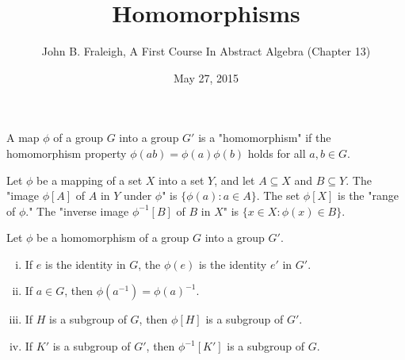 \documentclass[a4paper,11pt]{article}
\title{Homomorphisms}
\author{John B. Fraleigh, A First Course In Abstract Algebra (Chapter 13)}
\date{May 27, 2015}
\begin{document}
\maketitle
{}

\begin{outline}

    A map \(\phi\) of a group \(G\) into a group \(G'\) is a "homomorphism" if the
    homomorphism property \(\phi(ab) = \phi(a)\phi(b)\) holds for all \(a, b \in G\).
    
    Let \(\phi\) be a mapping of a set \(X\) into a set \(Y\), and let \(A \subseteq X\)
    and \(B \subseteq Y\). The "image \(\phi[A]\) of \(A\) in \(Y\) under \(\phi\)" is \(\{\phi(a) : a \in A\}\).
    The set \(\phi[X]\) is the "range of \(\phi\)." The "inverse image \(\phi^{-1}[B]\) of \(B\) in \(X\)" is
    \(\{x \in X : \phi(x) \in B\}\).
    
    Let \(\phi\) be a homomorphism of a group \(G\) into a group \(G'\).
    \begin{enumerate}[i.]
      \item If \(e\) is the identity in \(G\), the \(\phi(e)\) is the identity \(e'\) in \(G'\).
      \item If \(a \in G\), then \(\phi(a^{-1}) = \phi(a)^{-1}\).
      \item If \(H\) is a subgroup of \(G\), then \(\phi[H]\) is a subgroup of \(G'\).
      \item If \(K'\) is a subgroup of \(G'\), then \(\phi^{-1}[K']\) is a subgroup of \(G\).
    \end{enumerate}
    

\end{outline}
\end{document}
